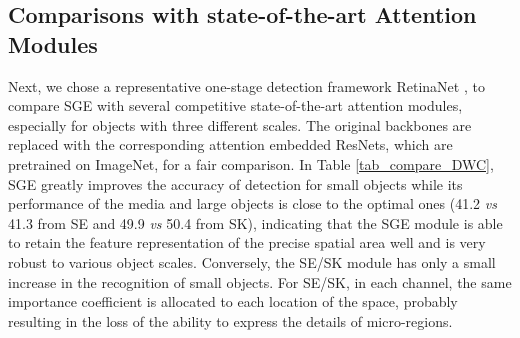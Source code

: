 \documentclass{article}
\begin{document}
	
	
	\subsection{Comparisons with state-of-the-art Attention Modules}
	Next, we chose a representative one-stage detection framework RetinaNet \cite{lin2017focal}, to compare SGE with several competitive state-of-the-art attention modules, especially for objects with three different scales. The original backbones are replaced with the corresponding attention embedded ResNets, which are pretrained on ImageNet, for a fair comparison. In Table \ref{tab_compare_DWC}, SGE greatly improves the accuracy of detection for small objects while its performance of the media and large objects is close to the optimal ones (41.2 \emph{vs} 41.3 from SE and 49.9 \emph{vs} 50.4 from SK), indicating that the SGE module is able to retain the feature representation of the precise spatial area well and is very robust to various object scales. Conversely, the SE/SK module has only a small increase in the recognition of small objects. For SE/SK, in each channel, the same importance coefficient is allocated to each location of the space, probably resulting in the loss of the ability to express the details of micro-regions.
	
\end{document}
